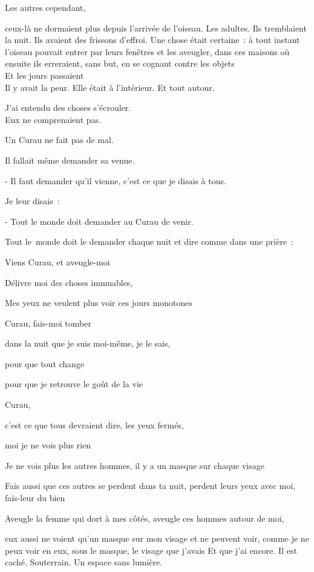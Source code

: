 Les autres cependant,

ceux-là ne dormaient plus depuis l'arrivée de l'oiseau. Les adultes. Ils
tremblaient la nuit. Ils avaient des frissons d'effroi. Une chose était
certaine~: à tout instant l'oiseau pouvait entrer par leurs fenêtres et
les aveugler, dans ces maisons où ensuite ils erreraient, sans but, en
se cognant contre les objets\\

Et les jours passaient\\

Il y avait la peur. Elle était à l'intérieur. Et tout autour.

J'ai entendu des choses s'écrouler.\\

Eux ne comprenaient pas.

Un Curau ne fait pas de mal.

Il fallait même demander sa venue.

- Il faut demander qu'il vienne, c'est ce que je disais à tous.

Je leur disais~:

- Tout le monde doit demander au Curau de venir.

Tout le~monde doit le demander chaque nuit et dire comme dans une
prière~:

Viens Curau, et aveugle-moi

Délivre moi des choses immuables,

Mes yeux ne veulent plus voir ces jours monotones

Curau, fais-moi tomber

dans la nuit que je suis moi-même, je le sais,

pour que tout change

pour que je retrouve le goût de la vie

Curau,

c'est ce que tous devraient dire, les yeux fermés,

moi je ne vois plus rien

Je ne vois plus les autres hommes, il y a un masque sur chaque visage

Fais aussi que ces autres se perdent dans ta nuit, perdent leurs yeux
avec moi, fais-leur du bien

Aveugle la femme qui dort à mes côtés, aveugle ces hommes autour de moi,

eux aussi ne voient qu'un masque sur mon visage et ne peuvent voir,
comme je ne peux voir en eux, sous le masque, le visage que j'avais Et
que j'ai encore. Il est caché. Souterrain. Un espace sans lumière.

